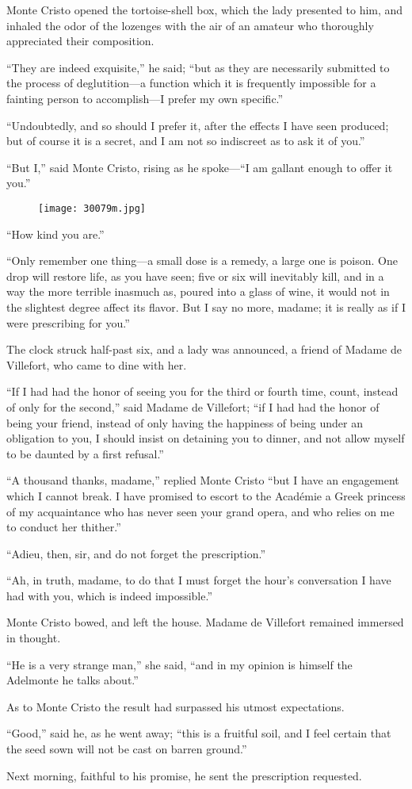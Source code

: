 Monte Cristo opened the tortoise-shell box, which the lady presented to
him, and inhaled the odor of the lozenges with the air of an amateur
who thoroughly appreciated their composition.

“They are indeed exquisite,” he said; “but as they are necessarily
submitted to the process of deglutition—a function which it is
frequently impossible for a fainting person to accomplish—I prefer my
own specific.”

“Undoubtedly, and so should I prefer it, after the effects I have seen
produced; but of course it is a secret, and I am not so indiscreet as
to ask it of you.”

“But I,” said Monte Cristo, rising as he spoke—“I am gallant enough to
offer it you.”

\begin{figure}[ht]
\texttt{[image: 30079m.jpg]}
\end{figure}

“How kind you are.”

“Only remember one thing—a small dose is a remedy, a large one is
poison. One drop will restore life, as you have seen; five or six will
inevitably kill, and in a way the more terrible inasmuch as, poured
into a glass of wine, it would not in the slightest degree affect its
flavor. But I say no more, madame; it is really as if I were
prescribing for you.”

The clock struck half-past six, and a lady was announced, a friend of
Madame de Villefort, who came to dine with her.

“If I had had the honor of seeing you for the third or fourth time,
count, instead of only for the second,” said Madame de Villefort; “if I
had had the honor of being your friend, instead of only having the
happiness of being under an obligation to you, I should insist on
detaining you to dinner, and not allow myself to be daunted by a first
refusal.”

“A thousand thanks, madame,” replied Monte Cristo “but I have an
engagement which I cannot break. I have promised to escort to the
Académie a Greek princess of my acquaintance who has never seen your
grand opera, and who relies on me to conduct her thither.”

“Adieu, then, sir, and do not forget the prescription.”

“Ah, in truth, madame, to do that I must forget the hour’s conversation
I have had with you, which is indeed impossible.”

Monte Cristo bowed, and left the house. Madame de Villefort remained
immersed in thought.

“He is a very strange man,” she said, “and in my opinion is himself the
Adelmonte he talks about.”

As to Monte Cristo the result had surpassed his utmost expectations.

“Good,” said he, as he went away; “this is a fruitful soil, and I feel
certain that the seed sown will not be cast on barren ground.”

Next morning, faithful to his promise, he sent the prescription
requested.
